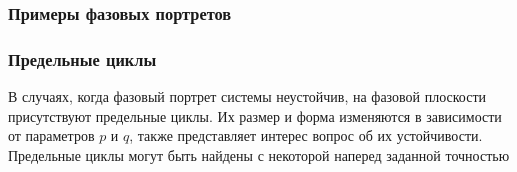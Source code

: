 \documentclass[slidestop,compress,mathserif]{beamer}
\begin{document}
\begin{frame}
\frametitle{Примеры фазовых портретов}
\begin{figure}[h!]
\vspace{-1em}
\vspace{-2em}
\end{figure}
\end{frame}
\begin{frame}
\frametitle{Предельные циклы}
\vspace{3em}
В случаях, когда фазовый портрет системы неустойчив, на фазовой плоскости присутствуют предельные циклы. Их размер и форма изменяются в зависимости от параметров $p$ и $q$, также представляет интерес вопрос об их устойчивости. Предельные циклы могут быть найдены с некоторой наперед заданной точностью 
\end{frame}
\end{document}
